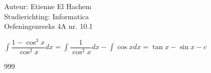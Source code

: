 \documentclass[a4paper]{article}
\begin{document}
  
\noindent \large Auteur: Etienne El Hachem \\
\noindent \large Studierichting: Informatica\\
\noindent \large Oefeningenreeks 4A nr. 10.1\\

\medskip

\normalsize

$\displaystyle\int\dfrac{1-\cos^3x}{\cos^2x}dx = \displaystyle\int\dfrac{1}{\cos^2x}dx - \displaystyle\int\cos x dx = \tan x - \sin x - c$

\begin{thebibliography}{999}
\end{thebibliography}
\end{document}
